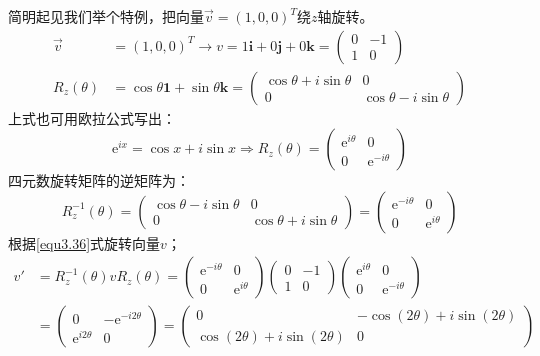 简明起见我们举个特例，把向量$\vec{v} = (1, 0, 0)^T$绕$z$轴旋转。
\begin{align}
\label{equ3.39}
\vec{v} &= (1, 0, 0)^T \rightarrow v = 1\mathbf{i} + 0\mathbf{j} + 0\mathbf{k} = 
	\begin{pmatrix}
		0 & -1 \\ 1 & 0
	\end{pmatrix}
\\
\label{equ3.40}
R_z(\theta) &= \cos \theta \mathbf{1} + \sin \theta \mathbf{k} =
	\begin{pmatrix}
		\cos \theta + i\sin \theta & 0 \\
		0 & \cos \theta - i\sin \theta
	\end{pmatrix}
\end{align}
上式也可用欧拉公式写出：
\begin{equation}
\label{equ3.41}
\mathrm{e}^{ix} = \cos x + i\sin x
\Rightarrow
R_z(\theta) = \begin{pmatrix}
				\mathrm{e}^{i\theta} & 0 \\
				0 & \mathrm{e}^{-i\theta}
			  \end{pmatrix}
\end{equation}
四元数旋转矩阵的逆矩阵为：
\begin{equation}
\label{equ3.42}
R_z^{-1} (\theta) = 
	\begin{pmatrix}
		\cos \theta - i\sin \theta & 0 \\
		0 & \cos \theta + i\sin \theta
	\end{pmatrix}
=
	\begin{pmatrix}
		\mathrm{e}^{-i\theta} & 0 \\
		0 & \mathrm{e}^{i\theta}
	\end{pmatrix}
\end{equation}
根据\ref{equ3.36}式旋转向量$v$；
\begin{align}
v' &= R_z^{-1} (\theta) v R_z(\theta) =
	\begin{pmatrix}
		\mathrm{e}^{-i\theta} & 0 \\
		0 & \mathrm{e}^{i\theta}
	\end{pmatrix}
	\begin{pmatrix}
	0 & -1 \\ 1 & 0
	\end{pmatrix}
	\begin{pmatrix}
		\mathrm{e}^{i\theta} & 0 \\
		0 & \mathrm{e}^{-i\theta}
	\end{pmatrix}
\nonumber \\
\label{equ3.43}
&= \begin{pmatrix}
		0 & -\mathrm{e}^{-i 2\theta} \\
		\mathrm{e}^{i 2\theta} & 0
	\end{pmatrix}
= \begin{pmatrix}
		0 & -\cos (2\theta) + i\sin (2\theta) \\
		\cos (2\theta) + i\sin (2\theta) & 0
  \end{pmatrix}
\end{align}
